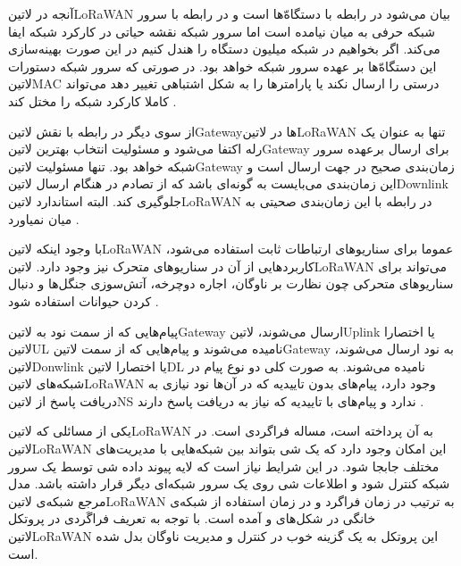 آنجه در ‌لاتین{LoRaWAN} بیان می‌شود در رابطه با دستگاه‌ّها است و در رابطه با سرور شبکه حرفی به میان نیامده است اما سرور شبکه نقشه حیاتی در کارکرد شبکه ایفا می‌کند.
اگر بخواهیم در شبکه میلیون دستگاه را هندل کنیم در این صورت بهینه‌سازی این دستگاه‌ّها بر عهده سرور شبکه خواهد بود. در صورتی که سرور شبکه دستورات ‌لاتین{MAC}
درستی را ارسال نکند یا پارامترها را به شکل اشتباهی تغییر دهد می‌تواند کاملا کارکرد شبکه را مختل کند
.

از سوی دیگر در رابطه با نقش ‌لاتین{Gateway}ها در ‌لاتین{LoRaWAN} تنها به عنوان یک رله اکتفا می‌شود و مسئولیت انتخاب بهترین ‌لاتین{Gateway} برای ارسال
برعهده سرور شبکه خواهد بود. تنها مسئولیت ‌لاتین{Gateway} زمان‌بندی صحیح در جهت ارسال است و این زمان‌بندی می‌بایست به گونه‌ای باشد که از تصادم در هنگام ارسال
‌لاتین{Downlink} جلوگیری کند. البته استاندارد ‌لاتین{LoRaWAN} در رابطه با این زمان‌بندی صحیتی به میان نمیاورد
.

با وجود اینکه ‌لاتین{LoRaWAN} عموما برای سناریوهای ارتباطات ثابت استفاده می‌شود، کاربردهایی از آن در سناریوهای متحرک نیز وجود دارد.
‌لاتین{LoRaWAN} می‌تواند برای سناریوهای متحرکی چون نظارت بر ناوگان، اجاره دوچرخه، آتش‌سوزی جنگل‌ها و دنبال کردن حیوانات
استفاده شود .

پیام‌هایی که از سمت نود به ‌لاتین{Gateway} ارسال می‌شوند، ‌لاتین{Uplink} یا اختصارا ‌لاتین{UL} نامیده می‌شوند و
پیام‌هایی که از سمت ‌لاتین{Gateway} به نود ارسال می‌شوند، ‌لاتین{Donwlink} یا اختصارا ‌لاتین{DL} نامیده می‌شوند.
به صورت کلی دو نوع پیام در شبکه‌های ‌لاتین{LoRaWAN} وجود دارد، پیام‌های بدون تاییدیه که در آن‌ها نود نیازی به دریافت پاسخ
از ‌لاتین{NS} ندارد و پیام‌های با تاییدیه که نیاز به دریافت پاسخ دارند
.

یکی از مسائلی که ‌لاتین{LoRaWAN} به آن پرداخته است، مساله فراگردی است. در ‌لاتین{LoRaWAN} این امکان وجود دارد
که یک شی بتواند بین شبکه‌هایی با مدیریت‌های مختلف جابجا شود. در این شرایط نیاز است که لایه پیوند داده شی توسط یک
سرور شبکه کنترل شود و اطلاعات شی روی یک سرور شبکه‌ای دیگر قرار داشته باشد. مدل مرجع شبکه‌ی ‌لاتین{LoRaWAN}
به ترتیب در زمان فراگرد و در زمان استفاده از شبکه‌ی خانگی در شکل‌های 
و  آمده است.
با توجه به تعریف فراگَردی در پروتکل ‌لاتین{LoRaWAN} این پروتکل به یک گزینه خوب در کنترل و مدیریت ناوگان بدل شده است.


